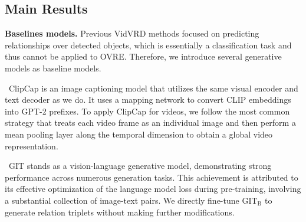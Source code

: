 \documentclass[letterpaper]{article}
\begin{document}
\subsection{Main Results}
\noindent\textbf{Baselines models. }
Previous VidVRD methods focused on predicting relationships over detected objects, which is essentially a classification task and thus cannot be applied to OVRE.
Therefore, we introduce several generative models as baseline models. 

\textbullet  \ ClipCap \cite{mokady2021clipcap} is an image captioning model that utilizes the same visual encoder and text decoder as we do.
It uses a mapping network to convert CLIP embeddings into GPT-2 prefixes.
To apply ClipCap for videos, we follow the most common strategy that treats each video frame as an individual image and then perform a mean pooling layer along the temporal dimension to obtain a global video representation. 

\textbullet  \ GIT \cite{wang2022git} stands as a vision-language generative model, demonstrating strong performance across numerous generation tasks. This achievement is attributed to its effective optimization of the language model loss during pre-training, involving a substantial collection of image-text pairs.
We directly fine-tune $\text{GIT}_{\text{B}}$ to generate relation triplets without making further modifications.




\end{document}
